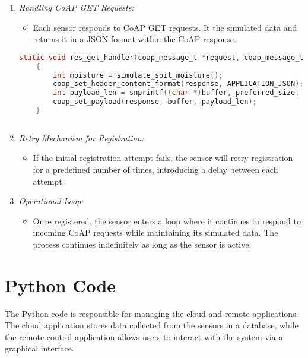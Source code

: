 \begin{enumerate}
    \item \textit{Handling CoAP GET Requests:}
    \begin{itemize}
        \item Each sensor responds to CoAP GET requests. It the simulated data and returns it in a JSON format within the CoAP response.
    \end{itemize}
    \begin{lstlisting}[language=C]
    static void res_get_handler(coap_message_t *request, coap_message_t *response, uint8_t *buffer, uint16_t preferred_size, int32_t *offset)
    {
        int moisture = simulate_soil_moisture();
        coap_set_header_content_format(response, APPLICATION_JSON);
        int payload_len = snprintf((char *)buffer, preferred_size, "{\"moisture\":%d}", moisture);
        coap_set_payload(response, buffer, payload_len);
    }
        
    \end{lstlisting}

    \item \textit{Retry Mechanism for Registration:}
    \begin{itemize}
        \item If the initial registration attempt fails, the sensor will retry registration for a predefined number of times, introducing a delay between each attempt.
    \end{itemize}

    \item \textit{Operational Loop:}
    \begin{itemize}
        \item Once registered, the sensor enters a loop where it continues to respond to incoming CoAP requests while maintaining its simulated data. The process continues indefinitely as long as the sensor is active.
    \end{itemize}
    
\end{enumerate}


\newpage

\section{Python Code}


The Python code is responsible for managing the cloud and remote applications. The cloud application stores data collected from the sensors in a database, while the remote control application allows users to interact with the system via a graphical interface.\\

